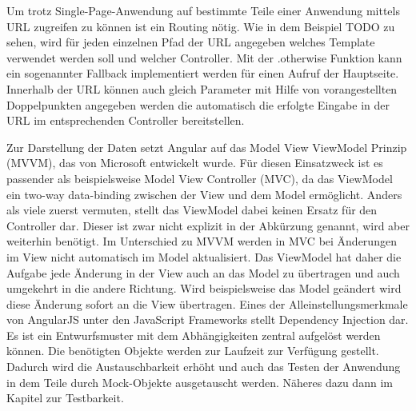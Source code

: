\documentclass[]{article}
\begin{document}
Um trotz Single-Page-Anwendung auf bestimmte Teile einer Anwendung
mittels URL zugreifen zu können ist ein Routing nötig. Wie in dem
Beispiel TODO zu sehen, wird für jeden einzelnen Pfad der URL angegeben
welches Template verwendet werden soll und welcher Controller. Mit der
.otherwise Funktion kann ein sogenannter Fallback implementiert werden
für einen Aufruf der Hauptseite. Innerhalb der URL können auch gleich
Parameter mit Hilfe von vorangestellten Doppelpunkten angegeben werden
die automatisch die erfolgte Eingabe in der URL im entsprechenden
Controller bereitstellen.

Zur Darstellung der Daten setzt Angular auf das Model View ViewModel
Prinzip (MVVM), das von Microsoft entwickelt wurde. Für diesen
Einsatzweck ist es passender als beispielsweise Model View Controller
(MVC), da das ViewModel ein two-way data-binding zwischen der View und
dem Model ermöglicht. Anders als viele zuerst vermuten, stellt das
ViewModel dabei keinen Ersatz für den Controller dar. Dieser ist zwar
nicht explizit in der Abkürzung genannt, wird aber weiterhin benötigt.
Im Unterschied zu MVVM werden in MVC bei Änderungen im View nicht
automatisch im Model aktualisiert. Das ViewModel hat daher die Aufgabe
jede Änderung in der View auch an das Model zu übertragen und auch
umgekehrt in die andere Richtung. Wird beispielsweise das Model geändert
wird diese Änderung sofort an die View übertragen. Eines der
Alleinstellungsmerkmale von AngularJS unter den JavaScript Frameworks
stellt Dependency Injection dar. Es ist ein Entwurfsmuster mit dem
Abhängigkeiten zentral aufgelöst werden können. Die benötigten Objekte
werden zur Laufzeit zur Verfügung gestellt. Dadurch wird die
Austauschbarkeit erhöht und auch das Testen der Anwendung in dem Teile
durch Mock-Objekte ausgetauscht werden. Näheres dazu dann im Kapitel zur
Testbarkeit.
\end{document}
